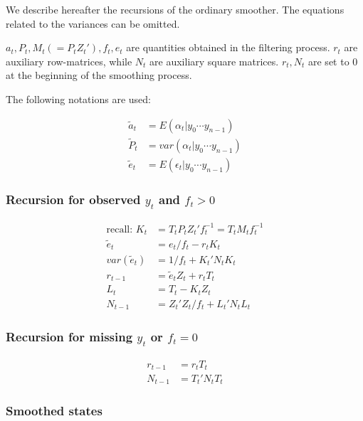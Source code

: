 \documentclass[
  letterpaper,
  DIV=11,
  numbers=noendperiod]{scrreprt}
\begin{document}
We describe hereafter the recursions of the ordinary smoother. The
equations related to the variances can be omitted.

\(a_t, P_t, M_t \left(=P_t Z_t' \right), f_t, e_t\) are quantities
obtained in the filtering process. \(r_t\) are auxiliary row-matrices,
while \(N_t\) are auxiliary square matrices. \(r_t,N_t\) are set to 0 at
the beginning of the smoothing process.

The following notations are used:

\[
\begin{align*}
\tilde a_t &=E\left(\alpha_{t} \vert y_0 \cdots y_{n-1}\right) \\
\tilde P_t &=var\left(\alpha_{t} \vert y_0 \cdots y_{n-1}\right) \\
\tilde e_t &=E\left(\epsilon_{t} \vert y_0 \cdots y_{n-1}\right)
\end{align*}
\]

\subsubsection{\texorpdfstring{Recursion for observed \(y_t\) and
\(f_t > 0\)}{Recursion for observed y\_t and f\_t \textgreater{} 0}}\label{recursion-for-observed-y_t-and-f_t-0}

\[
\begin{align*}
\text{recall: }K_t &= T_t P_t Z_t' f_t^{-1} = T_t M_t f_t^{-1}\\
\tilde e_t &= e_t / f_t - r_t K_t \\
var(\tilde e_t) &= 1/f_t + K_t' N_t K_t \\
r_{t-1} &= \tilde e_t Z_t + r_t T_t \\
L_t &= T_t - K_t Z_t \\
N_{t-1} &= Z_t' Z_t / f_t + L_t' N_t L_t 
\end{align*}
\]

\subsubsection{\texorpdfstring{Recursion for missing \(y_t\) or
\(f_t = 0\)}{Recursion for missing y\_t or f\_t = 0}}\label{recursion-for-missing-y_t-or-f_t-0}

\[
\begin{align*}
 r_{t-1} &= r_t T_t \\
N_{t-1} &= T_t' N_t T_t
\end{align*}
\]

\subsubsection{Smoothed states}\label{smoothed-states}
\end{document}
